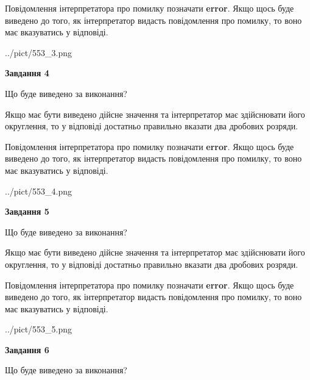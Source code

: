 \documentclass[12pt, ukrainian]{article}
\begin{document}
{\begin {Large}
Повідомлення інтерпретатора про помилку позначати \textbf{error}.
Якщо щось буде виведено до того, як інтерпретатор видасть повідомлення про помилку, 
то воно має вказуватись у відповіді. \par

\begin{center}
	{../pict/553_3.png}
\end{center}
\newpage

{\begin {center}\textbf{Завдання 4}\end {center}}\par
Що буде виведено за виконання? \par

Якщо має бути виведено дійсне значення та інтерпретатор має здійснювати його округлення, 
то у відповіді достатньо правильно вказати два дробових розряди.

Повідомлення інтерпретатора про помилку позначати \textbf{error}.
Якщо щось буде виведено до того, як інтерпретатор видасть повідомлення про помилку, 
то воно має вказуватись у відповіді. \par

\begin{center}
	{../pict/553_4.png}
\end{center}
\newpage

{\begin {center}\textbf{Завдання 5}\end {center}}\par
Що буде виведено за виконання? \par

Якщо має бути виведено дійсне значення та інтерпретатор має здійснювати його округлення, 
то у відповіді достатньо правильно вказати два дробових розряди.

Повідомлення інтерпретатора про помилку позначати \textbf{error}.
Якщо щось буде виведено до того, як інтерпретатор видасть повідомлення про помилку, 
то воно має вказуватись у відповіді. \par

\begin{center}
	{../pict/553_5.png}
\end{center}
\newpage

{\begin {center}\textbf{Завдання 6}\end {center}}\par
Що буде виведено за виконання? \par


\end{Large}}
\end{document}
